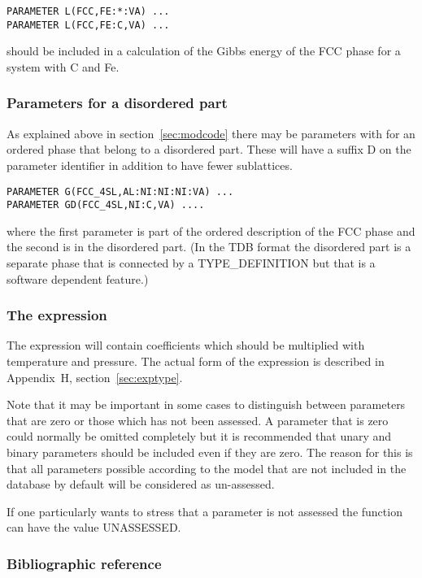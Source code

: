\documentclass[12pt]{article}
\begin{document}
\begin{verbatim}
PARAMETER L(FCC,FE:*:VA) ...
PARAMETER L(FCC,FE:C,VA) ...
\end{verbatim}

should be included in a calculation of the Gibbs energy of the FCC
phase for a system with C and Fe.

\subsubsection{Parameters for a disordered part}\label{sec:suffixd}

As explained above in section~\ref{sec:modcode} there may be parameters
with for an ordered phase that belong to a disordered part.  These
will have a suffix D on the parameter identifier in addition to have
fewer sublattices.

\begin{verbatim}
PARAMETER G(FCC_4SL,AL:NI:NI:NI:VA) ...
PARAMETER GD(FCC_4SL,NI:C,VA) ....
\end{verbatim}
where the first parameter is part of the ordered description of the
FCC phase and the second is in the disordered part.  (In the TDB
format the disordered part is a separate phase that is connected by a
TYPE\_DEFINITION but that is a software dependent feature.)

\subsubsection{The expression}

The expression will contain coefficients which should be multiplied
with temperature and pressure.  The actual form of the expression is
described in Appendix~H, section~\ref{sec:exptype}.

Note that it may be important in some cases to distinguish between
parameters that are zero or those which has not been assessed.  A
parameter that is zero could normally be omitted completely but it is
recommended that unary and binary parameters should be included even
if they are zero.  The reason for this is that all parameters possible
according to the model that are not included in the database by
default will be considered as un-assessed.

If one particularly wants to stress that a parameter is not assessed
the function can have the value UNASSESSED.

\subsubsection{Bibliographic reference}
\end{document}
